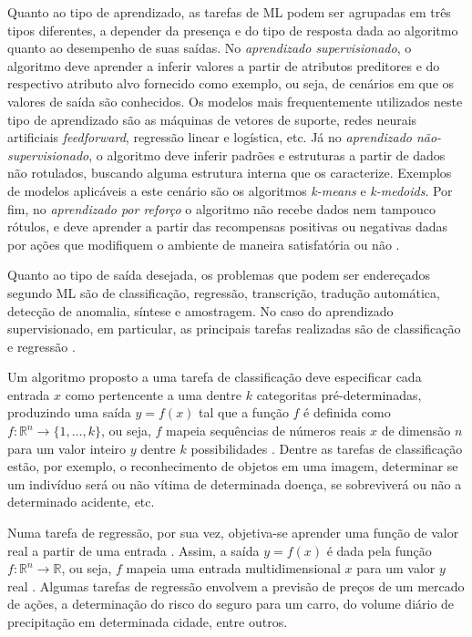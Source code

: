 Quanto ao tipo de aprendizado, as tarefas de ML podem ser agrupadas em três tipos diferentes, a depender da presença e do tipo de resposta dada ao algoritmo quanto ao desempenho de suas saídas. No \emph{aprendizado supervisionado}, o algoritmo deve aprender a inferir valores a partir de atributos preditores e do respectivo atributo alvo fornecido como exemplo, ou seja, de cenários em que os valores de saída são conhecidos. Os modelos mais frequentemente utilizados neste tipo de aprendizado são as máquinas de vetores de suporte, redes neurais artificiais \emph{feedforward}, regressão linear e logística, etc. Já no \emph{aprendizado não-supervisionado}, o algoritmo deve inferir padrões e estruturas a partir de dados não rotulados, buscando alguma estrutura interna que os caracterize. Exemplos de modelos aplicáveis a este cenário são os algoritmos \emph{k-means} e \emph{k-medoids}.  Por fim, no \emph{aprendizado por reforço} o algoritmo não recebe dados nem tampouco rótulos, e deve aprender a partir das recompensas positivas ou negativas dadas por ações que modifiquem o ambiente de maneira satisfatória ou não \cite{flach2012machine}.

Quanto ao tipo de saída desejada, os problemas que podem ser endereçados segundo ML são de classificação, regressão, transcrição, tradução automática, detecção de anomalia, síntese e amostragem. No caso do aprendizado supervisionado, em particular, as principais tarefas realizadas são de classificação e regressão \cite{flach2012machine}.

Um algoritmo proposto a uma tarefa de classificação deve especificar cada entrada $x$ como pertencente a uma dentre $k$ categoritas pré-determinadas, produzindo uma saída $y=f(x)$ tal que a função $f$ é definida como $f: \mathds{R}^n \rightarrow \{1, \ldots, k\}$, ou seja, $f$ mapeia sequências de números reais  $x$ de dimensão $n$ para um valor inteiro $y$ dentre $k$ possibilidades \cite{goodfellow2016deep}. Dentre as tarefas de classificação estão, por exemplo, o reconhecimento de objetos em uma imagem, determinar se um indivíduo será ou não vítima de determinada doença, se sobreviverá ou não a determinado acidente, etc.

Numa tarefa de regressão, por sua vez, objetiva-se aprender uma função de valor real a partir de uma entrada \cite{flach2012machine}. Assim, a saída $y=f(x)$ é dada pela função $f: \mathds{R}^n \rightarrow \mathds{R}$, ou seja, $f$ mapeia uma entrada multidimensional $x$ para um valor $y$ real \cite{goodfellow2016deep}. Algumas tarefas de regressão envolvem a previsão de preços de um mercado de ações, a determinação do risco do seguro para um carro, do volume diário de precipitação em determinada cidade, entre outros.

